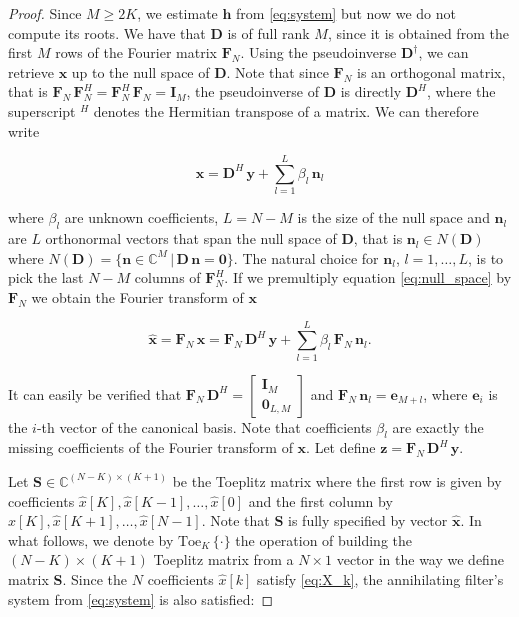 \documentclass{article}
\def\x{{\bm x}}
\def\hx{\hat{x}}
\def\bhx{\bm{\hat{x}}}
\def\y{{\bm y}}
\def\z{{\bm z}}
\def\e{{\bm e}}
\def\n{{\bm n}}
\def\D{{\bm D}}
\def\F{{\bm F}}
\def\I{{\bm I}}
\def\C{{\mathbb C}}
\providecommand{\e}[1]{\text{e}^{#1}}
\providecommand{\toe}[2]{\text{Toe}_{#2}\,\lbrace#1\rbrace}
\begin{document}
\begin{proof}
Since $M\geq2K$, we estimate $\bm{h}$ from \eqref{eq:system} but now we do not compute its roots.
We have that $\D$ is of full rank $M$, since it is obtained from the first $M$ rows of the 
Fourier matrix $\F_N$. Using the pseudoinverse $\D^\dagger$, we can retrieve $\x$ up to 
the null space of $\D$. Note that since $\F_N$ is an orthogonal matrix, that is 
$\F_N \, \F_N^H = \F_N^H \, \F_N = \I_M$, the pseudoinverse of $\D$ is directly $\D^H$,
where the superscript $^H$ denotes the Hermitian transpose of a matrix.
We can therefore write

\begin{equation}
\x = \D^H \, \y + \sum_{l=1}^{L} \beta_l \, \n_l
\label{eq:null_space}
\end{equation}

\noindent
where $\beta_l$ are unknown coefficients, $L=N-M$ is the size of the null space 
and $\n_l$ are $L$ orthonormal vectors that span the 
null space of $\D$, that is $\n_l \in N(\D)$ where 
$N(\D) = \lbrace \n \in \C^M \,\vert\, \D \, \n = \bm{0} \rbrace$. The natural choice for $\n_l$, 
$l=1,\ldots,L$, is to pick the last $N-M$ columns of $\F_N^H$. If we premultiply equation 
\eqref{eq:null_space} by $\F_N$ we obtain the Fourier transform of $\x$

\begin{equation}
\bhx = \F_N \, \x = \F_N \, \D^H \, \y + \sum_{l=1}^{L} \beta_l \, \F_N \, \n_l.
\label{eq:x_k_null_space}
\end{equation}

\noindent
It can easily be verified that $\F_N \, \D^H = \begin{bmatrix} \I_M \\ \bm{0}_{L,M} \end{bmatrix}$
and $\F_N \, \n_l = \e_{M+l}$, where $\e_i$ is the $i$-th vector of the canonical basis. 
Note that coefficients $\beta_l$ are exactly the missing coefficients of the Fourier transform of $\x$.
Let define $\z = \F_N \, \D^H \, \y$. 

Let $\bm{S} \in \C^{(N-K)\times(K+1)}$ be the Toeplitz matrix where the first row is given 
by coefficients $\hx[K], \hx[K-1], \ldots, \hx[0]$ and the first column by 
$\hx[K], \hx[K+1], \ldots, \hx[N-1]$. Note that $\bm{S}$ is fully specified by vector $\bhx$.
In what follows, we denote by $\toe{\cdot}{K}$ the operation of building the $(N-K)\times(K+1)$
Toeplitz matrix from a $N \times 1$ vector in the way we define matrix $\bm{S}$.
Since the $N$ coefficients $\hx[k]$ satisfy \eqref{eq:X_k}, the annihilating filter's system from 
\eqref{eq:system} is also satisfied:


\end{proof}
\end{document}
